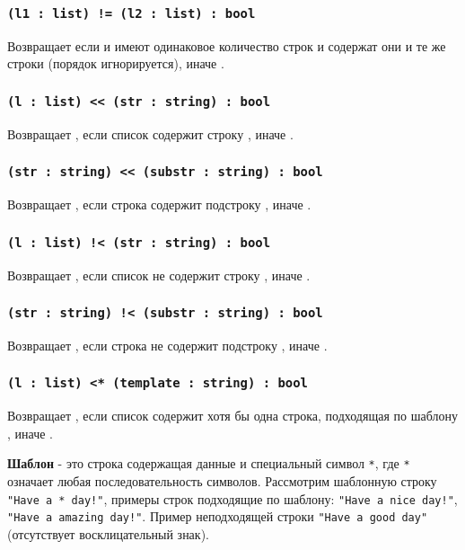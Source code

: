 \subsubsection{\lstinline|(l1 : list) != (l2 : list) : bool|}

Возвращает \false{} если  и  имеют одинаковое количество строк и содержат они и те же строки (порядок игнорируется), иначе \true{}.

\subsubsection{\lstinline|(l : list) << (str : string) : bool|}

Возвращает \true{}, если список  содержит строку , иначе \false{}.

\subsubsection{\lstinline|(str : string) << (substr : string) : bool|}

Возвращает \true{}, если строка  содержит подстроку , иначе \false{}.

\subsubsection{\lstinline|(l : list) !< (str : string) : bool|}

Возвращает \true{}, если список  не содержит строку , иначе \false{}.

\subsubsection{\lstinline|(str : string) !< (substr : string) : bool|}

Возвращает \true{}, если строка  не содержит подстроку , иначе \false{}.

\subsubsection{\lstinline|(l : list) <* (template : string) : bool|}

Возвращает \true{}, если список  содержит хотя бы одна строка, подходящая по шаблону , иначе \false{}.

{\bf Шаблон} - это строка содержащая данные и специальный символ \lstinline|*|, где \lstinline|*| означает любая последовательность символов. Рассмотрим шаблонную строку \lstinline|"Have a * day!"|, примеры строк подходящие по шаблону: \lstinline|"Have a nice day!"|, \lstinline|"Have a amazing day!"|. Пример неподходящей строки \lstinline|"Have a good day"| (отсутствует восклицательный знак).

